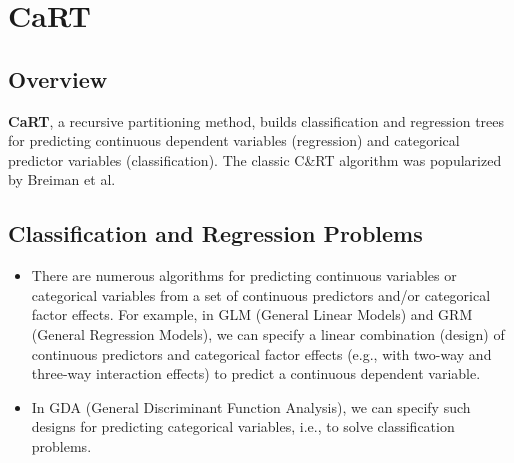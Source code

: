 \documentclass[caret-main.tex]{subfiles}
\begin{document}
\section{CaRT}

\subsection{Overview}

\textbf{CaRT}, a recursive partitioning method, builds classification and regression trees for predicting continuous dependent variables (regression) and categorical predictor variables (classification). The classic C\&RT algorithm was popularized by Breiman et al.

\subsection{Classification and Regression Problems}

\begin{itemize}
\item There are numerous algorithms for predicting continuous variables or categorical variables from a set of continuous predictors and/or categorical factor effects. For example, in GLM (General Linear Models) and GRM (General Regression Models), we can specify a linear combination (design) of continuous predictors and categorical factor effects (e.g., with two-way and three-way interaction effects) to predict a continuous dependent variable. 
\item In GDA (General Discriminant Function Analysis), we can specify such designs for predicting categorical variables, i.e., to solve classification problems.
\end{itemize}
\end{document}
